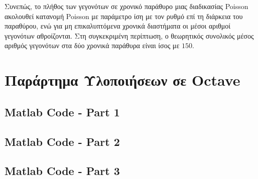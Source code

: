 \documentclass{article}
\begin{document}
Συνεπώς, το πλήθος των γεγονότων σε χρονικό παράθυρο μιας διαδικασίας Poisson
ακολουθεί κατανομή Poisson με παράμετρο ίση με τον ρυθμό επί τη διάρκεια του
παραθύρου, ενώ για μη επικαλυπτόμενα χρονικά διαστήματα οι μέσοι αριθμοί γεγονότων
αθροίζονται. Στη συγκεκριμένη περίπτωση, ο θεωρητικός συνολικός μέσος αριθμός
γεγονότων στα δύο χρονικά παράθυρα είναι ίσος με \(150\).

\newpage
\section{Παράρτημα Υλοποιήσεων σε Octave}

\subsection{Matlab Code - Part 1}


\subsection{Matlab Code - Part 2}


\subsection{Matlab Code - Part 3}

\end{document}
